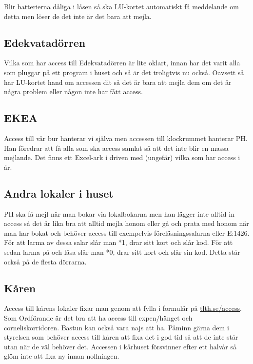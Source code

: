 \documentclass[10pt]{article}
\begin{document}
    Blir batterierna dåliga i låsen så ska LU-kortet automatiskt få meddelande om detta men löser de det inte är det bara att mejla.
    
    \subsection{Edekvatadörren}
    
    Vilka som har access till Edekvatadörren är lite oklart, innan har det varit alla som pluggar på ett program i huset och så är det troligtvis nu också. Oavsett så har LU-kortet hand om accessen dit så det är bara att mejla dem om det är några problem eller någon inte har fått access.
    
    \subsection{EKEA}
    
    Access till vår bur hanterar vi själva men accessen till klockrummet hanterar PH. Han föredrar att få alla som ska access samlat så att det inte blir en massa mejlande. Det finns ett Excel-ark i driven med (ungefär) vilka som har access i år.
    
    \subsection{Andra lokaler i huset}
    
    PH ska få mejl när man bokar via lokalbokarna men han lägger inte alltid in access så det är lika bra att alltid mejla honom eller gå och prata med honom när man har bokat och behöver access till exempelvis föreläsningssalarna eller E:1426. För att larma av dessa salar slår man *1, drar sitt kort och slår kod. För att sedan larma på och låsa slår man *0, drar sitt kort och slår sin kod. Detta står också på de flesta dörrarna.
    
    \subsection{Kåren}
    
    Access till kårens lokaler fixar man genom att fylla i formulär på \url{tlth.se/access}. Som Ordförande är det bra att ha access till expen/hänget och corneliskorridoren. Bastun kan också vara najs att ha. Påminn gärna dem i styrelsen som behöver access till kåren att fixa det i god tid så att de inte står utan när de väl behöver det. Accessen i kårhuset försvinner efter ett halvår så glöm inte att fixa ny innan nollningen.
    
\end{document}
